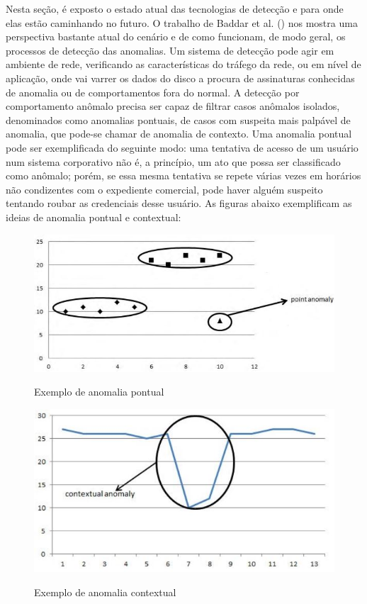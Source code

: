 Nesta seção, é exposto o estado atual das tecnologias de
detecção e para onde elas estão caminhando no futuro. O trabalho de
Baddar et al. (\citeyear{baddarxx}) nos mostra uma perspectiva bastante atual do cenário e
de como funcionam, de modo geral, os processos de detecção das anomalias. Um
sistema de detecção pode agir em ambiente de rede, verificando as
características do tráfego da rede, ou em nível de aplicação, onde vai varrer
os dados do disco a procura de assinaturas conhecidas de anomalia ou de
comportamentos fora do normal. A detecção por comportamento anômalo precisa
ser capaz de filtrar casos anômalos isolados, denominados como anomalias
pontuais, de casos com suspeita mais palpável de anomalia, que pode-se chamar de
anomalia de contexto. Uma anomalia pontual pode ser exemplificada do seguinte
modo: uma tentativa de acesso de um usuário num sistema corporativo não é, a
princípio, um ato que possa ser classificado como anômalo; porém, se essa
mesma tentativa se repete várias vezes em horários não condizentes com o
expediente comercial, pode haver alguém suspeito tentando roubar as
credenciais desse usuário. As figuras abaixo exemplificam as ideias de
anomalia pontual e contextual:

\begin{figure}[H]
\caption{\small Exemplo de anomalia pontual}
\centering
\includegraphics[scale=0.5]{figs/anomalia_pontual.JPG}
\label{f.anomalia_pontual}
\end{figure}

\begin{figure}[H]
\caption{\small Exemplo de anomalia contextual}
\centering
\includegraphics[scale=0.5]{figs/anomalia_contextual.JPG}
\label{f.contextual}
\end{figure}

